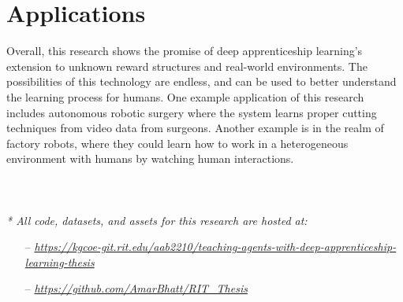 \documentclass[12pt,american]{report}
\begin{document}
\section{Applications}
Overall, this research shows the promise of deep apprenticeship learning's extension to unknown reward structures and real-world environments. The possibilities of this technology are endless, and can be used to better understand the learning process for humans.  One example application of this research includes autonomous robotic surgery where the system learns proper cutting techniques from video data from surgeons. Another example is in the realm of factory robots, where they could learn how to work in a heterogeneous environment with humans by watching human interactions. 
\\
\\
\\
\\


\begingroup
    \fontsize{10pt}{6pt}\selectfont
\textit{* All code, datasets, and assets for this research are hosted at:}
\begin{itemize}
\item[--] \href{https://kgcoe-git.rit.edu/aab2210/teaching-agents-with-deep-apprenticeship-learning-thesis}{\textit{https://kgcoe-git.rit.edu/aab2210/teaching-agents-with-deep-apprenticeship-learning-thesis}}
\item[--] \href{https://github.com/AmarBhatt/RIT_Thesis}{\textit{https://github.com/AmarBhatt/RIT\_Thesis}}
\end{itemize}
\endgroup

  \nocite{*}


\begin{singlespace}

\end{singlespace}

\appendix
\end{document}
